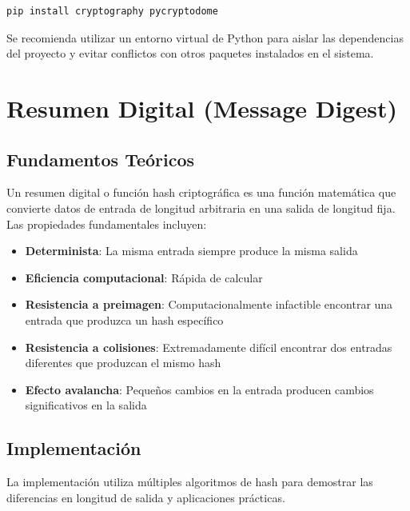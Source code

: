 \documentclass[12pt,a4paper]{article}
\begin{document}
\begin{lstlisting}[language=bash, caption=Instalación de bibliotecas requeridas]
pip install cryptography pycryptodome
\end{lstlisting}

\begin{securitygoodpractice}
    Se recomienda utilizar un entorno virtual de Python para aislar las dependencias del proyecto y evitar conflictos con otros paquetes instalados en el sistema.
\end{securitygoodpractice}

\newpage

\section{Resumen Digital (Message Digest)}

\subsection{Fundamentos Teóricos}

Un resumen digital o función hash criptográfica es una función matemática que
convierte datos de entrada de longitud arbitraria en una salida de longitud
fija. Las propiedades fundamentales incluyen:

\begin{itemize}
    \item \textbf{Determinista}: La misma entrada siempre produce la misma salida
    \item \textbf{Eficiencia computacional}: Rápida de calcular
    \item \textbf{Resistencia a preimagen}: Computacionalmente infactible encontrar una entrada que produzca un hash específico
    \item \textbf{Resistencia a colisiones}: Extremadamente difícil encontrar dos entradas diferentes que produzcan el mismo hash
    \item \textbf{Efecto avalancha}: Pequeños cambios en la entrada producen cambios significativos en la salida
\end{itemize}

\subsection{Implementación}

\begin{cryptomethod}
    La implementación utiliza múltiples algoritmos de hash para demostrar las diferencias en longitud de salida y aplicaciones prácticas.
\end{cryptomethod}
\end{document}
